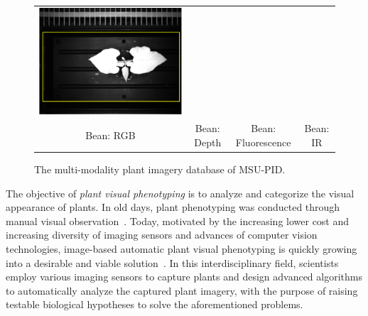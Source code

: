 \begin{figure}
\begin{centering}
\begin{tabular}{@{}c c c c}
\includegraphics[width=.23\textwidth]{Figures/FourModalities/B_ir}\\
Bean: RGB &  Bean: Depth & Bean: Fluorescence & Bean: IR \\
\end{tabular}
\caption{The multi-modality plant imagery database of MSU-PID. }
\label{fig:fourmodality}
\end{centering}
\end{figure}


The objective of {\it plant visual phenotyping} is to analyze and categorize the visual appearance of plants. %
In old days, plant phenotyping was conducted through manual visual observation~\cite{Erblichkeit1903}.
Today, motivated by the increasing lower cost and increasing diversity of imaging sensors and advances of computer vision technologies, image-based automatic plant visual phenotyping is quickly growing into a desirable and viable solution~\cite{furbank2011phenomics,cruz2015depi}.
In this interdisciplinary field, scientists employ various imaging sensors to capture plants and design advanced algorithms to automatically analyze the captured plant imagery, with the purpose of raising testable biological hypotheses to solve the aforementioned problems.



